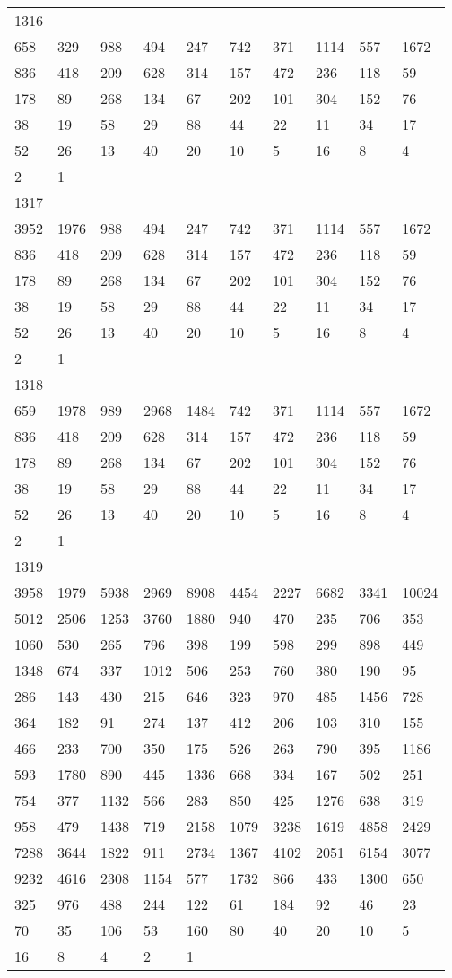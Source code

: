 \begin{longtable}{*{10}{l}}
1316&&&&&&&&&\\
658& 329& 988& 494& 247& 742& 371& 1114& 557& 1672\\
836& 418& 209& 628& 314& 157& 472& 236& 118& 59\\
178& 89& 268& 134& 67& 202& 101& 304& 152& 76\\
38& 19& 58& 29& 88& 44& 22& 11& 34& 17\\
52& 26& 13& 40& 20& 10& 5& 16& 8& 4\\
2& 1& \\

1317&&&&&&&&&\\
3952& 1976& 988& 494& 247& 742& 371& 1114& 557& 1672\\
836& 418& 209& 628& 314& 157& 472& 236& 118& 59\\
178& 89& 268& 134& 67& 202& 101& 304& 152& 76\\
38& 19& 58& 29& 88& 44& 22& 11& 34& 17\\
52& 26& 13& 40& 20& 10& 5& 16& 8& 4\\
2& 1& \\

1318&&&&&&&&&\\
659& 1978& 989& 2968& 1484& 742& 371& 1114& 557& 1672\\
836& 418& 209& 628& 314& 157& 472& 236& 118& 59\\
178& 89& 268& 134& 67& 202& 101& 304& 152& 76\\
38& 19& 58& 29& 88& 44& 22& 11& 34& 17\\
52& 26& 13& 40& 20& 10& 5& 16& 8& 4\\
2& 1& \\

1319&&&&&&&&&\\
3958& 1979& 5938& 2969& 8908& 4454& 2227& 6682& 3341& 10024\\
5012& 2506& 1253& 3760& 1880& 940& 470& 235& 706& 353\\
1060& 530& 265& 796& 398& 199& 598& 299& 898& 449\\
1348& 674& 337& 1012& 506& 253& 760& 380& 190& 95\\
286& 143& 430& 215& 646& 323& 970& 485& 1456& 728\\
364& 182& 91& 274& 137& 412& 206& 103& 310& 155\\
466& 233& 700& 350& 175& 526& 263& 790& 395& 1186\\
593& 1780& 890& 445& 1336& 668& 334& 167& 502& 251\\
754& 377& 1132& 566& 283& 850& 425& 1276& 638& 319\\
958& 479& 1438& 719& 2158& 1079& 3238& 1619& 4858& 2429\\
7288& 3644& 1822& 911& 2734& 1367& 4102& 2051& 6154& 3077\\
9232& 4616& 2308& 1154& 577& 1732& 866& 433& 1300& 650\\
325& 976& 488& 244& 122& 61& 184& 92& 46& 23\\
70& 35& 106& 53& 160& 80& 40& 20& 10& 5\\
16& 8& 4& 2& 1& \\


\end{longtable}
